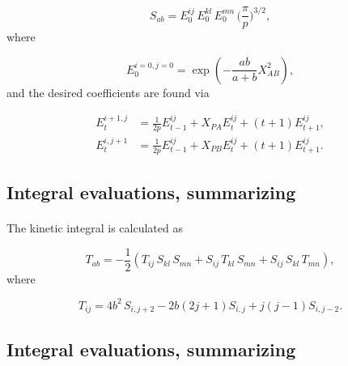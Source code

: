 \documentclass[%
twoside,                 %
final,                   %
10pt]{article}
\begin{document}
\begin{equation}
 S_{ab} = E^{ij}_0\,E^{kl}_0\,E^{mn}_0\,\Big(\frac{\pi}{p}\Big)^{3/2},
\end{equation}
where

\begin{equation}
 E^{i=0,j=0}_0 = \exp(-\frac{ab}{a+b}X_{AB}^2),
\end{equation}
and the desired coefficients are found via

\begin{equation}
\begin{split}
 E^{i+1,j}_t & = \frac{1}{2p}E^{ij}_{t-1} + X_{PA}E^{ij}_t + (t+1)E^{ij}_{t+1}, \\
 E^{i,j+1}_t & = \frac{1}{2p}E^{ij}_{t-1} + X_{PB}E^{ij}_t + (t+1)E^{ij}_{t+1}.
\end{split}
\end{equation}



\subsection*{Integral evaluations, summarizing}

\paragraph{}

The kinetic integral is calculated as

\begin{equation}
 T_{ab} = -\frac{1}{2}(T_{ij}\,S_{kl}\,S_{mn} + S_{ij}\,T_{kl}\,S_{mn} + S_{ij}\,S_{kl}\,T_{mn}),
\end{equation}
where

\begin{equation}
 T_{ij} = 4b^2\,S_{i,j+2} - 2b(2j + 1)S_{i,j} + j(j-1)S_{i,j-2}.
\end{equation}



\subsection*{Integral evaluations, summarizing}

\paragraph{}
\end{document}
